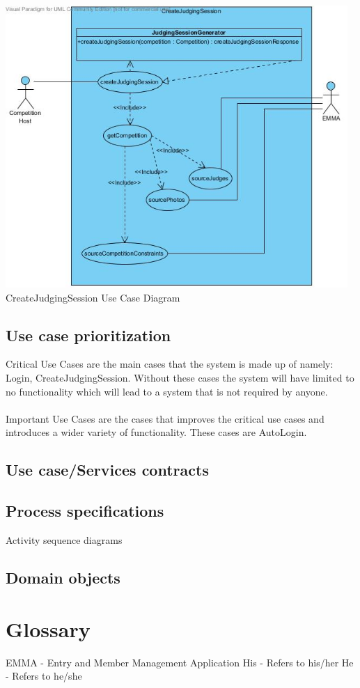 \documentclass[10pt,a4paper]{article}
\begin{document}
\begin{center}
\advance\leftskip-1.3cm
\includegraphics[width=130mm]{Pictures/CreateJudgingSession.jpg} 
CreateJudgingSession Use Case Diagram 
\end{center}

\subsection{Use case prioritization}
Critical Use Cases are the main cases that the system is made up of namely: Login, CreateJudgingSession. Without these cases the system will have limited to no functionality which will lead to a system that is not required by anyone.
\\ \\
Important Use Cases are the cases that improves the critical use cases and introduces a wider variety of functionality. These cases are AutoLogin.


\subsection{Use case/Services contracts}
\subsection{Process specifications}
Activity sequence diagrams
\subsection{Domain objects}
\section{Glossary}
EMMA - Entry and Member Management Application
His - Refers to his/her
He - Refers to he/she
\end{document}
